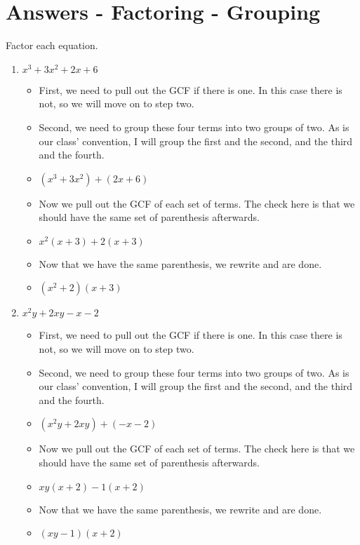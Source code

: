\documentclass{article}
\begin{document}
\newpage
\section{Answers - Factoring - Grouping}
Factor each equation. \\
\begin{enumerate}
\item $x^{3} + 3x^{2} + 2x + 6$
  \begin{itemize}
  \item First, we need to pull out the GCF if there is one. In this case there is not, so we will move on to step two.
  \item Second, we need to group these four terms into two groups of two. As is our class' convention, I will group the first and the second, and the third and the fourth.
  \item [] $(x^{3}+3x^{2}) +(2x+6)$
  \item Now we pull out the GCF of each set of terms. The check here is that we should have the same set of parenthesis afterwards.
  \item [] $x^{2}(x+3)+2(x+3)$  
  \item Now that we have the same parenthesis, we rewrite and are done.
  \item [] $(x^{2}+2)(x+3)$
  \end{itemize}
\item $x^{2}y + 2xy - x - 2$
  \begin{itemize}
  \item First, we need to pull out the GCF if there is one. In this case there is not, so we will move on to step two.
  \item Second, we need to group these four terms into two groups of two. As is our class' convention, I will group the first and the second, and the third and the fourth.
  \item [] $(x^{2}y+2xy) +(-x-2)$
  \item Now we pull out the GCF of each set of terms. The check here is that we should have the same set of parenthesis afterwards.
  \item [] $xy(x+2)-1(x+2)$
  \item Now that we have the same parenthesis, we rewrite and are done.
  \item [] $(xy-1)(x+2)$
  \end{itemize}

\end{enumerate}
\end{document}
